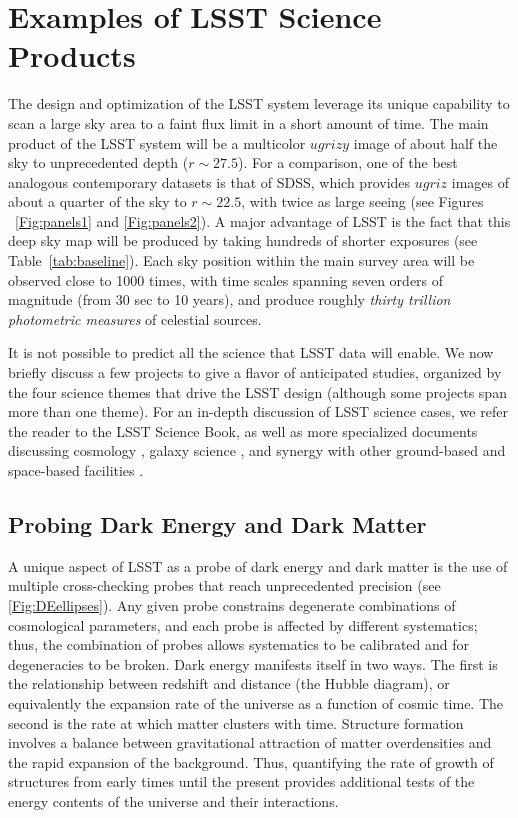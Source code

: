 
\section{Examples of LSST Science Products}
\label{Sec:science}

The design and optimization of the LSST system leverage its unique capability
to scan a large sky area to a faint flux limit in a short amount of time.
The main product of the LSST system will be a multicolor $ugrizy$ image of about
half the sky to unprecedented depth ($r\sim27.5$). For a comparison,
one of the best
analogous contemporary datasets is that of SDSS, which provides $ugriz$ images
of about a quarter of the sky to $r\sim22.5$, with twice as large seeing
(see Figures ~\ref{Fig:panels1} and \ref{Fig:panels2}). A major advantage of LSST
is the fact that this deep sky map will be produced by taking hundreds of
shorter exposures (see Table~\ref{tab:baseline}). Each sky position within the main survey area
will be observed close to 1000 times, with time scales spanning seven orders of
magnitude (from 30 sec to 10 years), and produce roughly \textit{thirty
trillion photometric measures} of celestial sources.

It is not possible to predict all the science that LSST data will enable.
We now briefly discuss a few projects to give a flavor of anticipated studies,
organized by the four science themes that drive the LSST design
(although some projects span more than one theme).
For an in-depth discussion of LSST science cases, we refer the reader to the
LSST Science Book, as well as more specialized documents discussing cosmology
\citep{2012arXiv1211.0310L, 2018RPPh...81f6901Z}, galaxy science
\citep{2017arXiv170801617R}, and synergy with other ground-based and
space-based facilities
\citep{2015arXiv150107897J,2016arXiv161001661N,2017ApJS..233...21R}.

\subsection{Probing Dark Energy and Dark Matter }

A unique aspect of LSST as a probe of dark energy and dark matter is
the use of multiple cross-checking probes that reach unprecedented
precision (see \autoref{Fig:DEellipses}). Any given probe constrains
degenerate combinations of cosmological parameters, and each probe is
affected by different systematics; thus, the combination of probes
allows systematics to be calibrated and for degeneracies to be
broken.  Dark energy manifests itself in two ways.  The first is the
relationship between redshift and distance (the Hubble diagram), or
equivalently the expansion rate of the universe as a function of
cosmic time.  The second is the rate at which matter clusters with
time.
Structure formation involves a balance between
gravitational attraction of matter overdensities and the rapid
expansion of the background.  Thus, quantifying the rate of growth of
structures from early times until the present provides additional
tests of the energy contents of the universe and their interactions.


